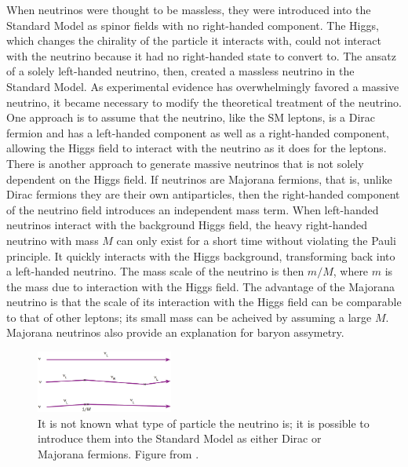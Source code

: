 When neutrinos were thought to be massless, they were introduced into the Standard Model as spinor fields with no right-handed component.  The Higgs, which changes the chirality of the particle it interacts with, could not interact with the neutrino because it had no right-handed state to convert to.  The ansatz of a solely left-handed neutrino, then, created a massless neutrino in the Standard Model.  As experimental evidence has overwhelmingly favored a massive neutrino, it became necessary to modify the theoretical treatment of the neutrino.  One approach is to assume that the neutrino, like the SM leptons, is a Dirac fermion and has a left-handed component as well as a right-handed component, allowing the Higgs field to interact with the neutrino as it does for the leptons.  There is another approach to generate massive neutrinos that is not solely dependent on the Higgs field.  If neutrinos are Majorana fermions, that is, unlike Dirac fermions they are their own antiparticles, then the right-handed component of the neutrino field introduces an independent mass term.  When left-handed neutrinos interact with the background Higgs field, the heavy right-handed neutrino with mass $M$ can only exist for a short time without violating the Pauli principle.  It quickly interacts with the Higgs background, transforming back into a left-handed neutrino.  The mass scale of the neutrino is then $m/M$, where $m$ is the mass due to interaction with the Higgs field.  The advantage of the Majorana neutrino is that the scale of its interaction with the Higgs field can be comparable to that of other leptons; its small mass can be acheived by assuming a large $M$.  Majorana neutrinos also provide an explanation for baryon assymetry.  
\begin{figure}[htp]
\centering
\includegraphics[width=0.4\textwidth]{figures/neutrinoMass.eps}
\caption{It is not known what type of particle the neutrino is; it is possible to introduce them into the Standard Model as either Dirac or Majorana fermions.  Figure from \cite{neutrinoMass}.}
\label{fig:leptonMass}
\end{figure}  

